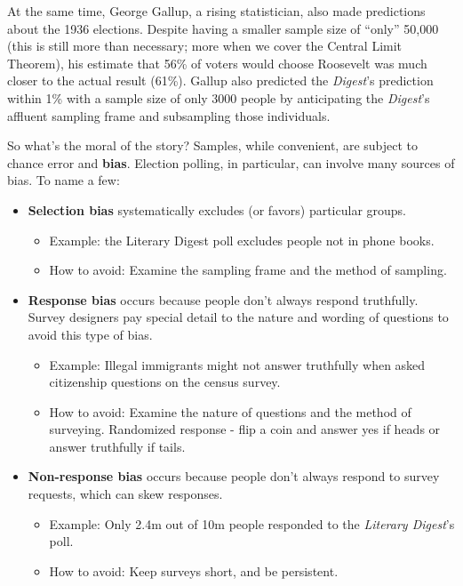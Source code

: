 \documentclass[
  letterpaper,
  DIV=11,
  numbers=noendperiod]{scrreprt}
\providecommand{\tightlist}{%
  \setlength{\itemsep}{0pt}\setlength{\parskip}{0pt}}\usepackage{longtable,booktabs,array}
\begin{document}
At the same time, George Gallup, a rising statistician, also made
predictions about the 1936 elections. Despite having a smaller sample
size of ``only'' 50,000 (this is still more than necessary; more when we
cover the Central Limit Theorem), his estimate that 56\% of voters would
choose Roosevelt was much closer to the actual result (61\%). Gallup
also predicted the \emph{Digest}'s prediction within 1\% with a sample
size of only 3000 people by anticipating the \emph{Digest}'s affluent
sampling frame and subsampling those individuals.

So what's the moral of the story? Samples, while convenient, are subject
to chance error and \textbf{bias}. Election polling, in particular, can
involve many sources of bias. To name a few:

\begin{itemize}
\tightlist
\item
  \textbf{Selection bias} systematically excludes (or favors) particular
  groups.

  \begin{itemize}
  \tightlist
  \item
    Example: the Literary Digest poll excludes people not in phone
    books.
  \item
    How to avoid: Examine the sampling frame and the method of sampling.
  \end{itemize}
\item
  \textbf{Response bias} occurs because people don't always respond
  truthfully. Survey designers pay special detail to the nature and
  wording of questions to avoid this type of bias.

  \begin{itemize}
  \tightlist
  \item
    Example: Illegal immigrants might not answer truthfully when asked
    citizenship questions on the census survey.
  \item
    How to avoid: Examine the nature of questions and the method of
    surveying. Randomized response - flip a coin and answer yes if heads
    or answer truthfully if tails.
  \end{itemize}
\item
  \textbf{Non-response bias} occurs because people don't always respond
  to survey requests, which can skew responses.

  \begin{itemize}
  \tightlist
  \item
    Example: Only 2.4m out of 10m people responded to the \emph{Literary
    Digest}'s poll.
  \item
    How to avoid: Keep surveys short, and be persistent.
  \end{itemize}
\end{itemize}
\end{document}
